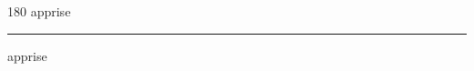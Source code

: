 
\begin{frame}
\begin{center}
\begin{turn}{180}
{\fontsize{2.5cm}{1em}\selectfont apprise}
\end{turn}
\vspace{1em}\par  
\hrule
\vspace{1em}\par  
{\fontsize{2.5cm}{1em}\selectfont apprise}
\end{center}
\end{frame}
